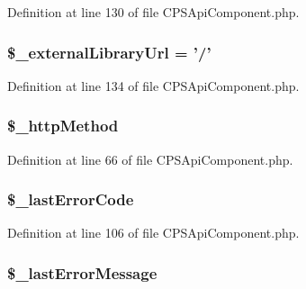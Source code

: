 Definition at line 130 of file CPSApiComponent.php.

\hypertarget{classCPSApiComponent_aae8a45534cedd7fc0881ca1995d8bb9c}{
\subsubsection[{\$\_\-externalLibraryUrl}]{\setlength{\rightskip}{0pt plus 5cm}\$\_\-externalLibraryUrl = '/'}}
\label{classCPSApiComponent_aae8a45534cedd7fc0881ca1995d8bb9c}


Definition at line 134 of file CPSApiComponent.php.

\hypertarget{classCPSApiComponent_a1fa7e8f053c645c627f16bcf41f2416a}{
\subsubsection[{\$\_\-httpMethod}]{\setlength{\rightskip}{0pt plus 5cm}\$\_\-httpMethod}}
\label{classCPSApiComponent_a1fa7e8f053c645c627f16bcf41f2416a}


Definition at line 66 of file CPSApiComponent.php.

\hypertarget{classCPSApiComponent_a9d205559114adfd52ac69bbb094a8a1a}{
\subsubsection[{\$\_\-lastErrorCode}]{\setlength{\rightskip}{0pt plus 5cm}\$\_\-lastErrorCode}}
\label{classCPSApiComponent_a9d205559114adfd52ac69bbb094a8a1a}


Definition at line 106 of file CPSApiComponent.php.

\hypertarget{classCPSApiComponent_a204d1af51663d8a1317949e796fe5fca}{
\subsubsection[{\$\_\-lastErrorMessage}]{\setlength{\rightskip}{0pt plus 5cm}\$\_\-lastErrorMessage}}
\label{classCPSApiComponent_a204d1af51663d8a1317949e796fe5fca}


